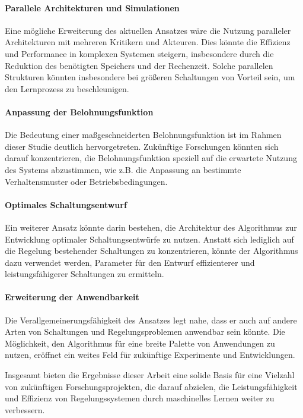 \paragraph{Parallele Architekturen und Simulationen}
Eine mögliche Erweiterung des aktuellen Ansatzes wäre die Nutzung paralleler Architekturen mit mehreren Kritikern und Akteuren. Dies könnte die Effizienz und Performance in komplexen Systemen steigern, insbesondere durch die Reduktion des benötigten Speichers und der Rechenzeit. Solche parallelen Strukturen könnten insbesondere bei größeren Schaltungen von Vorteil sein, um den Lernprozess zu beschleunigen.

\paragraph{Anpassung der Belohnungsfunktion}
Die Bedeutung einer maßgeschneiderten Belohnungsfunktion ist im Rahmen dieser Studie deutlich hervorgetreten. Zukünftige Forschungen könnten sich darauf konzentrieren, die Belohnungsfunktion speziell auf die erwartete Nutzung des Systems abzustimmen, wie z.B. die Anpassung an bestimmte Verhaltensmuster oder Betriebsbedingungen.

\paragraph{Optimales Schaltungsentwurf}
Ein weiterer Ansatz könnte darin bestehen, die Architektur des Algorithmus zur Entwicklung optimaler Schaltungsentwürfe zu nutzen. Anstatt sich lediglich auf die Regelung bestehender Schaltungen zu konzentrieren, könnte der Algorithmus dazu verwendet werden, Parameter für den Entwurf effizienterer und leistungsfähigerer Schaltungen zu ermitteln.

\paragraph{Erweiterung der Anwendbarkeit}
Die Verallgemeinerungsfähigkeit des Ansatzes legt nahe, dass er auch auf andere Arten von Schaltungen und Regelungsproblemen anwendbar sein könnte. Die Möglichkeit, den Algorithmus für eine breite Palette von Anwendungen zu nutzen, eröffnet ein weites Feld für zukünftige Experimente und Entwicklungen.

Insgesamt bieten die Ergebnisse dieser Arbeit eine solide Basis für eine Vielzahl von zukünftigen Forschungsprojekten, die darauf abzielen, die Leistungsfähigkeit und Effizienz von Regelungssystemen durch maschinelles Lernen weiter zu verbessern.

